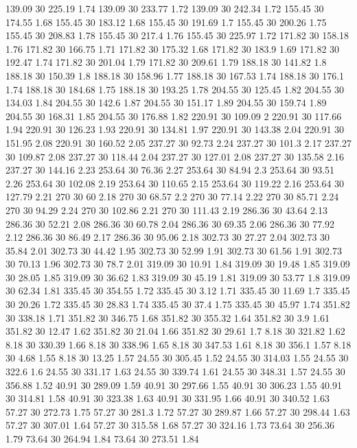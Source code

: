 139.09	30	225.19	1.74
139.09	30	233.77	1.72
139.09	30	242.34	1.72
155.45	30	174.55	1.68
155.45	30	183.12	1.68
155.45	30	191.69	1.7
155.45	30	200.26	1.75
155.45	30	208.83	1.78
155.45	30	217.4	1.76
155.45	30	225.97	1.72
171.82	30	158.18	1.76
171.82	30	166.75	1.71
171.82	30	175.32	1.68
171.82	30	183.9	1.69
171.82	30	192.47	1.74
171.82	30	201.04	1.79
171.82	30	209.61	1.79
188.18	30	141.82	1.8
188.18	30	150.39	1.8
188.18	30	158.96	1.77
188.18	30	167.53	1.74
188.18	30	176.1	1.74
188.18	30	184.68	1.75
188.18	30	193.25	1.78
204.55	30	125.45	1.82
204.55	30	134.03	1.84
204.55	30	142.6	1.87
204.55	30	151.17	1.89
204.55	30	159.74	1.89
204.55	30	168.31	1.85
204.55	30	176.88	1.82
220.91	30	109.09	2
220.91	30	117.66	1.94
220.91	30	126.23	1.93
220.91	30	134.81	1.97
220.91	30	143.38	2.04
220.91	30	151.95	2.08
220.91	30	160.52	2.05
237.27	30	92.73	2.24
237.27	30	101.3	2.17
237.27	30	109.87	2.08
237.27	30	118.44	2.04
237.27	30	127.01	2.08
237.27	30	135.58	2.16
237.27	30	144.16	2.23
253.64	30	76.36	2.27
253.64	30	84.94	2.3
253.64	30	93.51	2.26
253.64	30	102.08	2.19
253.64	30	110.65	2.15
253.64	30	119.22	2.16
253.64	30	127.79	2.21
270	30	60	2.18
270	30	68.57	2.2
270	30	77.14	2.22
270	30	85.71	2.24
270	30	94.29	2.24
270	30	102.86	2.21
270	30	111.43	2.19
286.36	30	43.64	2.13
286.36	30	52.21	2.08
286.36	30	60.78	2.04
286.36	30	69.35	2.06
286.36	30	77.92	2.12
286.36	30	86.49	2.17
286.36	30	95.06	2.18
302.73	30	27.27	2.04
302.73	30	35.84	2.01
302.73	30	44.42	1.95
302.73	30	52.99	1.91
302.73	30	61.56	1.91
302.73	30	70.13	1.96
302.73	30	78.7	2.01
319.09	30	10.91	1.84
319.09	30	19.48	1.85
319.09	30	28.05	1.85
319.09	30	36.62	1.83
319.09	30	45.19	1.81
319.09	30	53.77	1.8
319.09	30	62.34	1.81
335.45	30	354.55	1.72
335.45	30	3.12	1.71
335.45	30	11.69	1.7
335.45	30	20.26	1.72
335.45	30	28.83	1.74
335.45	30	37.4	1.75
335.45	30	45.97	1.74
351.82	30	338.18	1.71
351.82	30	346.75	1.68
351.82	30	355.32	1.64
351.82	30	3.9	1.61
351.82	30	12.47	1.62
351.82	30	21.04	1.66
351.82	30	29.61	1.7
8.18	30	321.82	1.62
8.18	30	330.39	1.66
8.18	30	338.96	1.65
8.18	30	347.53	1.61
8.18	30	356.1	1.57
8.18	30	4.68	1.55
8.18	30	13.25	1.57
24.55	30	305.45	1.52
24.55	30	314.03	1.55
24.55	30	322.6	1.6
24.55	30	331.17	1.63
24.55	30	339.74	1.61
24.55	30	348.31	1.57
24.55	30	356.88	1.52
40.91	30	289.09	1.59
40.91	30	297.66	1.55
40.91	30	306.23	1.55
40.91	30	314.81	1.58
40.91	30	323.38	1.63
40.91	30	331.95	1.66
40.91	30	340.52	1.63
57.27	30	272.73	1.75
57.27	30	281.3	1.72
57.27	30	289.87	1.66
57.27	30	298.44	1.63
57.27	30	307.01	1.64
57.27	30	315.58	1.68
57.27	30	324.16	1.73
73.64	30	256.36	1.79
73.64	30	264.94	1.84
73.64	30	273.51	1.84

